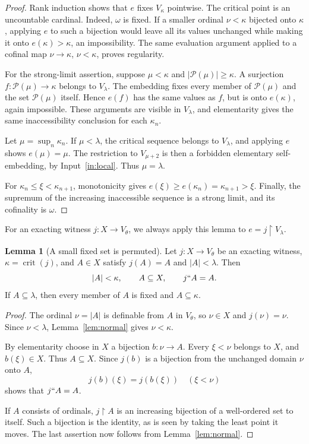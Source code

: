 \documentclass[11pt,letterpaper]{article}
\theoremstyle{definition}
\newtheorem{lemma}[definition]{Lemma}
\numberwithin{equation}{section}
\newcommand{\crit}{\operatorname{crit}}
\newcommand{\Pow}{\mathcal P}
\newcommand{\restr}{\mathbin{\upharpoonright}}
\begin{document}
\begin{proof}
Rank induction shows that $e$ fixes $V_\kappa$ pointwise. The critical point is an uncountable cardinal. Indeed, $\omega$ is fixed. If a smaller ordinal $\nu<\kappa$ bijected onto $\kappa$, applying $e$ to such a bijection would leave all its values unchanged while making it onto $e(\kappa)>\kappa$, an impossibility. The same evaluation argument applied to a cofinal map $\nu\to\kappa$, $\nu<\kappa$, proves regularity.

For the strong-limit assertion, suppose $\mu<\kappa$ and $|\Pow(\mu)|\ge\kappa$. A surjection $f:\Pow(\mu)\to\kappa$ belongs to $V_\lambda$. The embedding fixes every member of $\Pow(\mu)$ and the set $\Pow(\mu)$ itself. Hence $e(f)$ has the same values as $f$, but is onto $e(\kappa)$, again impossible. These arguments are visible in $V_\lambda$, and elementarity gives the same inaccessibility conclusion for each $\kappa_n$.

Let $\mu=\sup_n\kappa_n$. If $\mu<\lambda$, the critical sequence belongs to $V_\lambda$, and applying $e$ shows $e(\mu)=\mu$. The restriction to $V_{\mu+2}$ is then a forbidden elementary self-embedding, by Input~\ref{in:local}. Thus $\mu=\lambda$.

For $\kappa_n\le\xi<\kappa_{n+1}$, monotonicity gives
$e(\xi)\ge e(\kappa_n)=\kappa_{n+1}>\xi$.
Finally, the supremum of the increasing inaccessible sequence is a strong limit, and its cofinality is $\omega$.
\end{proof}

For an exacting witness $j:X\to V_\theta$, we always apply this lemma to $e=j\restr V_\lambda$.

\begin{lemma}[A small fixed set is permuted]\label{lem:small-fixed}
Let $j:X\to V_\theta$ be an exacting witness, $\kappa=\crit(j)$, and $A\in X$ satisfy $j(A)=A$ and $|A|<\lambda$. Then
\[
|A|<\kappa,\qquad A\subseteq X,\qquad j``A=A.
\]
If $A\subseteq\lambda$, then every member of $A$ is fixed and $A\subseteq\kappa$.
\end{lemma}

\begin{proof}
The ordinal $\nu=|A|$ is definable from $A$ in $V_\theta$, so $\nu\in X$ and $j(\nu)=\nu$. Since $\nu<\lambda$, Lemma~\ref{lem:normal} gives $\nu<\kappa$.

By elementarity choose in $X$ a bijection $b:\nu\to A$. Every $\xi<\nu$ belongs to $X$, and $b(\xi)\in X$. Thus $A\subseteq X$. Since $j(b)$ is a bijection from the unchanged domain $\nu$ onto $A$,
\[
j(b)(\xi)=j(b(\xi))\quad(\xi<\nu)
\]
shows that $j``A=A$.

If $A$ consists of ordinals, $j\restr A$ is an increasing bijection of a well-ordered set to itself. Such a bijection is the identity, as is seen by taking the least point it moves. The last assertion now follows from Lemma~\ref{lem:normal}.
\end{proof}
\end{document}
